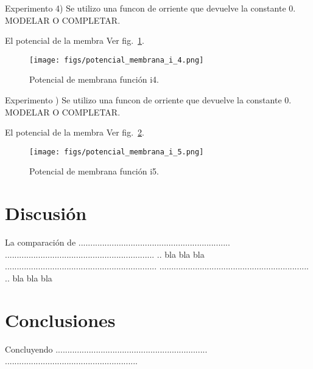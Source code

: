 \documentclass[aps,prl,twocolumn,groupedaddress]{revtex4-2}
\begin{document}
Experimento 4) Se utilizo una funcon de orriente que devuelve la constante 0. MODELAR O COMPLETAR.

El potencial de la membra
Ver fig.~\ref{fig4}.

\begin{figure}[h!]
\centering
\texttt{[image: figs/potencial\_membrana\_i\_4.png]}
\caption{
Potencial de membrana función i4.\label{fig4}
}
\end{figure}

Experimento ) Se utilizo una funcon de orriente que devuelve la constante 0. MODELAR O COMPLETAR.

El potencial de la membra
Ver fig.~\ref{fig5}.

\begin{figure}[h!]
\centering
\texttt{[image: figs/potencial\_membrana\_i\_5.png]}
\caption{
Potencial de membrana función i5. \label{fig5}
}
\end{figure}









\section{Discusión}

La comparación de ................................................................
...............................................................
.. bla bla bla ................................................................
...............................................................
.. bla bla bla

\section{Conclusiones}

Concluyendo ................................................................
........................................................


%
\end{document}
